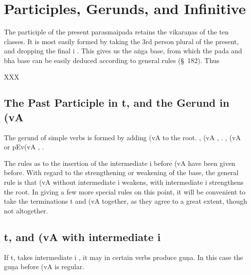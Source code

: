 \def\DevnagVersion{2.17}%
\chapter{Participles, Gerunds, and Infinitive}

\s The participle of the present parasmaipada retains the vikaraṇas of
the ten classes. It is most easily formed by taking the 3rd person
plural of the present, and dropping the final {\dn i} . This gives us
the aṅga base, from which the pada and bha base can be easily deduced
according to general rules (\S~182). Thus

XXX

\section{The Past Participle in {\dn t,}  and the Gerund in
  {\dn (vA} }

\s The gerund of simple verbs is formed by adding {\dn (vA}  to the
root. {\dn {}} , {\dn {}(vA} , . {\dn {}}
, {\dn {}(vA}  or {\dn pEv(vA} , .

The rules as to the insertion of the intermediate {\dn i}  before
{\dn (vA}  have been given before. With regard to the strengthening
or weakening of the base, the general rule is that {\dn (vA} 
without intermediate {\dn i}  weakens, with intermediate {\dn i} 
strengthens the root. In giving a few more special rules on this point,
it will be convenient to take the terminations {\dn t}  and {\dn (vA}
 together, as they agree to a great extent, though not
altogether.

\section{{\dn t,}  and {\dn (vA}  with intermediate {\dn i}
  }

\s If {\dn t,}  takes intermediate {\dn i} , it may in certain
verbs produce guṇa. In this case the guṇa before {\dn (vA}  is
regular.


